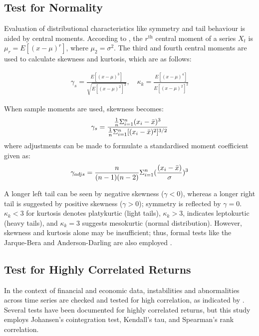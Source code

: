 \documentclass[a4paper]{article}
\theoremstyle{plain}
\theoremstyle{definition}
\theoremstyle{remark}
\begin{document}
\subsection{Test for Normality}
Evaluation of distributional characteristics like symmetry and tail behaviour is aided by central moments. According to \cite{Bai2005}, the $r^{\text{th}}$ central moment of a series $X_{t}$ is $\mu_{r} = E[(x - \mu)^r]$, where $\mu_2 = \sigma^2$. The third and fourth central moments are used to calculate skewness and kurtosis, which are as follows:

\begin{align}\label{eq1} 
\gamma_{s} = \frac{E[(x-\mu)^{3}]}{\sqrt{E[(x-\mu)^{2}]^{3}}}, \quad \kappa_{k} = \frac{E[(x-\mu)^{4}]}{E[(x-\mu)^2]^{2}}
\end{align}

When sample moments are used, skewness becomes:
\begin{align*}
    \gamma_{s} = \frac{\frac{1}{n}\Sigma_{i=1}^{n}(x_{i} - \Bar{x})^{3}}{\frac{1}{n}\Sigma_{i=1}^{n}[(x_{i} - \Bar{x})^{2}]^{3/2}}
\end{align*}
where adjustments can be made to formulate a standardised moment coefficient given as:
 \begin{align}\label{eq3}
     \gamma_{adjs} = \frac{n}{(n-1)(n-2)}\Sigma_{i=1}^{n} (\frac{(x_{i} - \Bar{x})}{\sigma})^{3}
 \end{align}

A longer left tail can be seen by negative skewness ($\gamma < 0$), whereas a longer right tail is suggested by positive skewness ($\gamma > 0$); symmetry is reflected by $\gamma = 0$. $\kappa_k < 3$ for kurtosis denotes platykurtic (light tails), $\kappa_k > 3$, indicates leptokurtic (heavy tails), and $\kappa_k = 3$ suggests mesokurtic (normal distribution).
However, skewness and kurtosis alone may be insufficient; thus, formal tests like the Jarque-Bera and Anderson-Darling are also employed \citep{geary1947testing, Bai2005}.


  
\subsection{Test for Highly Correlated Returns}
In the context of financial and economic data, instabilities and abnormalities across time series are checked and tested for high correlation, as indicated by \cite{chesnay2001does}. Several tests have been documented for highly correlated returns, but this study employs Johansen's cointegration test, Kendall's tau, and Spearman's rank correlation.
\end{document}
